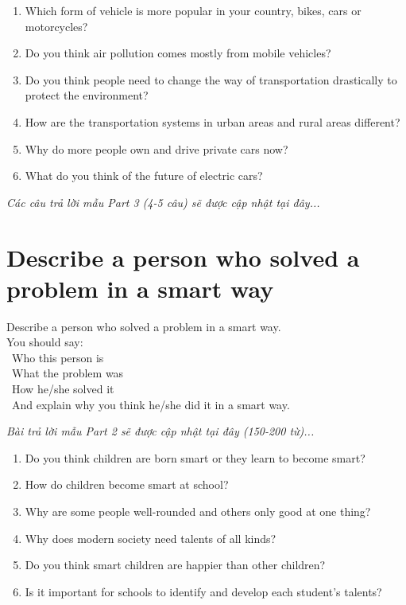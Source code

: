 \begin{ieltsprompt}
\begin{enumerate}[itemsep=4pt]
    \item Which form of vehicle is more popular in your country, bikes, cars or motorcycles?
    \item Do you think air pollution comes mostly from mobile vehicles?
    \item Do you think people need to change the way of transportation drastically to protect the environment?
    \item How are the transportation systems in urban areas and rural areas different?
    \item Why do more people own and drive private cars now?
    \item What do you think of the future of electric cars?
\end{enumerate}
\end{ieltsprompt}

\vspace{1em}
\textit{Các câu trả lời mẫu Part 3 (4-5 câu) sẽ được cập nhật tại đây...}
\vspace{2em}

\section{Describe a person who solved a problem in a smart way}
\begin{ieltsprompt}
Describe a person who solved a problem in a smart way. \\
You should say: \\
\textbullet\ Who this person is \\
\textbullet\ What the problem was \\
\textbullet\ How he/she solved it \\
\textbullet\ And explain why you think he/she did it in a smart way. \\
\end{ieltsprompt}

\vspace{1em}
\textit{Bài trả lời mẫu Part 2 sẽ được cập nhật tại đây (150-200 từ)...}
\vspace{2em}

\begin{ieltsprompt}
\begin{enumerate}[itemsep=4pt]
    \item Do you think children are born smart or they learn to become smart?
    \item How do children become smart at school?
    \item Why are some people well-rounded and others only good at one thing?
    \item Why does modern society need talents of all kinds?
    \item Do you think smart children are happier than other children?
    \item Is it important for schools to identify and develop each student's talents?
\end{enumerate}
\end{ieltsprompt}

